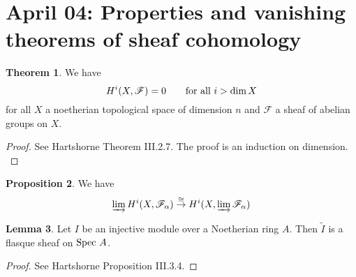 \documentclass[10pt,reqno]{amsart}
\theoremstyle{definition}
\newtheorem{theorem}{Theorem}
\newtheorem{proposition}[theorem]{Proposition}
\newtheorem{lemma}[theorem]{Lemma}
\theoremstyle{remark}
\numberwithin{equation}{section}
\numberwithin{theorem}{section}
\newcommand*{\red}{\textcolor{red}}
\newcommand{\OO}{{\mathcal O}}
\newcommand{\spec}{\textup{Spec }}
\newcommand{\FF}{{\mathscr F}}
\newcommand{\wt}{\widetilde}
\begin{document}
\section{April 04: Properties and vanishing theorems of sheaf cohomology}
\begin{theorem} We have
\[H^i(X,\FF) = 0 \quad \quad \textup{for all $i > \dim X$}\]
for all $X$ a noetherian topological space of dimension $n$ and $\FF$ a sheaf of abelian groups on $X$.
\end{theorem}
\begin{proof}
See Hartshorne Theorem III.2.7. The proof is an induction on dimension. \red{} %
\end{proof}

\begin{proposition} We have
\[\varinjlim H^i(X,\FF_{\alpha}) \stackrel{\cong}{\to} H^i(X, \varinjlim \FF_{\alpha})\]

\end{proposition}

\begin{lemma} Let $I$ be an injective module over a Noetherian ring $A$. Then $\wt{I}$ is a flasque sheaf on $\spec A$.
\end{lemma}
\begin{proof}
See Hartshorne Proposition III.3.4.
\end{proof}
\end{document}
